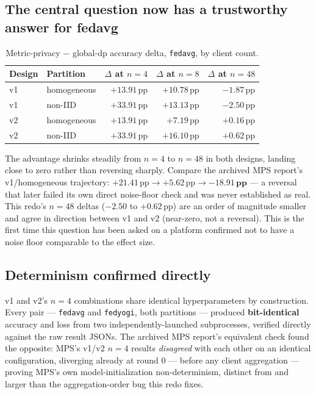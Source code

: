 \documentclass[11pt]{article}
\newcommand{\code}[1]{\texttt{#1}}
\newcommand{\pp}{\,\text{pp}}
\begin{document}
\subsection{The central question now has a trustworthy answer for fedavg}

\begin{table}[h]
\centering
\begin{tabular}{llrrr}
\toprule
Design & Partition & $\Delta$ at $n{=}4$ & $\Delta$ at $n{=}8$ & $\Delta$ at $n{=}48$ \\
\midrule
v1 & homogeneous & $+13.91\pp$ & $+10.78\pp$ & $-1.87\pp$ \\
v1 & non-IID     & $+33.91\pp$ & $+13.13\pp$ & $-2.50\pp$ \\
v2 & homogeneous & $+13.91\pp$ & $+7.19\pp$  & $+0.16\pp$ \\
v2 & non-IID     & $+33.91\pp$ & $+16.10\pp$ & $+0.62\pp$ \\
\bottomrule
\end{tabular}
\caption{Metric-privacy $-$ global-dp accuracy delta, \code{fedavg}, by client count.}
\label{tab:deltas}
\end{table}

\noindent The advantage shrinks steadily from $n{=}4$ to $n{=}48$ in both designs, landing close to
zero rather than reversing sharply. Compare the archived MPS report's v1/homogeneous trajectory:
$+21.41\pp \to +5.62\pp \to \mathbf{-18.91\pp}$ --- a reversal that later failed its own direct
noise-floor check and was never established as real. This redo's $n{=}48$ deltas ($-2.50$ to
$+0.62\pp$) are an order of magnitude smaller and agree in direction between v1 and v2 (near-zero,
not a reversal). This is the first time this question has been asked on a platform confirmed not to
have a noise floor comparable to the effect size.

\subsection{Determinism confirmed directly}

v1 and v2's $n{=}4$ combinations share identical hyperparameters by construction. Every pair ---
\code{fedavg} and \code{fedyogi}, both partitions --- produced \textbf{bit-identical} accuracy and
loss from two independently-launched subprocesses, verified directly against the raw result JSONs.
The archived MPS report's equivalent check found the opposite: MPS's v1/v2 $n{=}4$ results
\emph{disagreed} with each other on an identical configuration, diverging already at round 0 ---
before any client aggregation ---proving MPS's own model-initialization non-determinism, distinct
from and larger than the aggregation-order bug this redo fixes.
\end{document}
